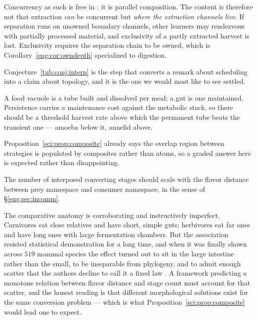 \begin{conjecture}
\label{tub:conj:intern}
Concurrency as such is free in \rhoc{}: it is parallel composition. The content
is therefore not that extraction \emph{can} be concurrent but \emph{where the
extraction channels live}. If separation runs on unowned boundary channels,
other learners may rendezvous with partially processed material, and exclusivity
of a partly extracted harvest is lost. Exclusivity requires the separation chain
to be owned, which is Corollary~\ref{eng:cor:owndepth} specialized to digestion.
\end{conjecture}

Conjecture~\ref{tub:conj:intern} is the step that converts a remark about
scheduling into a claim about topology, and it is the one we would most like to
see settled.

\begin{conjecture}
\label{tub:conj:transient}
A food vacuole is a tube built and dissolved per meal; a gut is one maintained.
Persistence carries a maintenance cost against the metabolic stack, so there
should be a threshold harvest rate above which the permanent tube beats the
transient one --- amoeba below it, annelid above.
\end{conjecture}

Proposition~\ref{sci:prop:composite} already says the overlap region between
strategies is populated by composites rather than atoms, so a graded answer here
is expected rather than disappointing.

\begin{conjecture}
\label{tub:conj:depth}
The number of interposed converting stages should scale with the flavor distance
between prey namespace and consumer namespace, in the sense of
\S\ref{eng:sec:incomm}.
\end{conjecture}

The comparative anatomy is corroborating and instructively imperfect. Carnivores
eat close relatives and have short, simple guts; herbivores eat far ones and
have long ones with large fermentation chambers. But the association resisted
statistical demonstration for a long time, and when it was finally shown across
$519$ mammal species the effect turned out to sit in the large intestine rather
than the small, to be inseparable from phylogeny, and to admit enough scatter
that the authors decline to call it a fixed law \cite{duquecorrea2021}. A
framework predicting a monotone relation between flavor distance and stage count
must account for that scatter, and the honest reading is that different
morphological solutions exist for the same conversion problem --- which is what
Proposition~\ref{sci:prop:composite} would lead one to expect.

